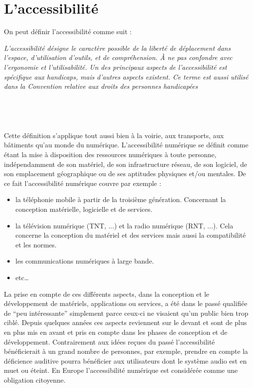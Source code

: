 \documentclass[french,a4paper]{report}
\newenvironment{extrait}[1]{%
\pushQED{#1}\begin{center}\begin{minipage}{0.8\linewidth}%
\setlength{\parindent}{10pt}\slshape\og}%
{\fg\end{minipage}\\\vspace{0.4cm}%
\nopagebreak\begin{minipage}{0.9\linewidth}
\hfill\small\popQED\end{minipage}\\\vspace{0.2cm}\end{center}}
\begin{document}
\section{L'accessibilité}
On peut définir l'accessibilité comme suit :
\begin{extrait}{Wikipedia}
L’accessibilité désigne le caractère possible de la liberté de déplacement dans
l'espace, d'utilisation d'outils, et de compréhension. À ne pas confondre avec l’ergonomie
et l’utilisabilité. Un des principaux aspects de l'accessibilité est spécifique aux handicaps,
mais d'autres aspects existent. Ce terme est aussi utilisé dans la Convention relative aux
droits des personnes handicapées
\end{extrait}
\vspace{0.4cm}
Cette définition s'applique tout aussi bien à la voirie, aux transports, aux bâtiments
qu'au monde du numérique. L'accessibilité numérique se définit comme étant la mise à
disposition
des ressources numériques à toute personne, indépendamment de son matériel, de
son infrastructure réseau, de son logiciel, de son emplacement géographique ou
de ses aptitudes physiques et/ou mentales.
\newline
De ce fait l'accessibilité numérique couvre par exemple :
\begin{itemize}\setlength{\itemsep}{0.4\baselineskip}
\item la téléphonie mobile à partir de la troisième génération. Concernant la conception matérielle, logicielle et de services.
\item la télévision numérique (TNT, ...) et la radio numérique (RNT, ...). Cela concerne la conception du matériel et des services mais aussi la compatibilité et les normes.
\item les communications numériques à large bande.
\item etc\dots \\
\end{itemize}
La prise en compte de ces différents aspects, dans la conception et le développement de matériels,
applications ou services, a été dans le passé qualifiée de \enquote{peu intéressante} simplement
parce ceux-ci ne visaient qu'un public bien trop ciblé. Depuis quelques années ces aspects reviennent
sur le devant et sont de plus en plus mis en avant et pris en compte dans les phases de conception
et de développement. Contrairement aux idées reçues du passé l'accessibilité bénéficierait à un
grand nombre de personnes, par exemple, prendre en compte la déficience auditive pourra bénéficier
aux utilisateurs dont le système audio est en muet ou éteint. En Europe l'accessibilité numérique
est considérée comme une obligation citoyenne.
\newline
\end{document}
